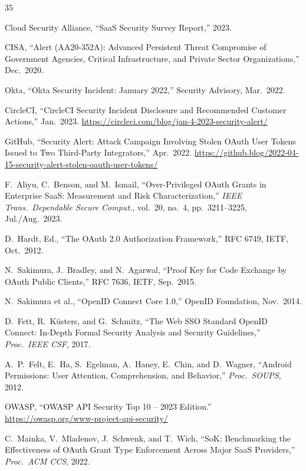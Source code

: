 \documentclass[12pt,a4paper]{report}
\begin{document}
\begin{thebibliography}{35}

Cloud Security Alliance, ``SaaS Security Survey Report,'' 2023.

CISA, ``Alert (AA20-352A): Advanced Persistent Threat Compromise of Government Agencies,
Critical Infrastructure, and Private Sector Organizations,'' Dec.\ 2020.

Okta, ``Okta Security Incident: January 2022,'' Security Advisory, Mar.\ 2022.

CircleCI, ``CircleCI Security Incident Disclosure and Recommended Customer Actions,'' Jan.\ 2023.
\url{https://circleci.com/blog/jan-4-2023-security-alert/}

GitHub, ``Security Alert: Attack Campaign Involving Stolen OAuth User Tokens Issued to Two
Third-Party Integrators,'' Apr.\ 2022.
\url{https://github.blog/2022-04-15-security-alert-stolen-oauth-user-tokens/}

F.\ Aliyu, C.\ Benson, and M.\ Ismail, ``Over-Privileged OAuth Grants in Enterprise SaaS:
Measurement and Risk Characterization,'' \textit{IEEE Trans.\ Dependable Secure Comput.},
vol.\ 20, no.\ 4, pp.\ 3211--3225, Jul./Aug.\ 2023.

D.\ Hardt, Ed., ``The OAuth 2.0 Authorization Framework,'' RFC 6749, IETF, Oct.\ 2012.

N.\ Sakimura, J.\ Bradley, and N.\ Agarwal, ``Proof Key for Code Exchange by OAuth Public
Clients,'' RFC 7636, IETF, Sep.\ 2015.

N.\ Sakimura et al., ``OpenID Connect Core 1.0,'' OpenID Foundation, Nov.\ 2014.

D.\ Fett, R.\ K\"{u}sters, and G.\ Schmitz, ``The Web SSO Standard OpenID Connect:
In-Depth Formal Security Analysis and Security Guidelines,'' \textit{Proc.\ IEEE CSF}, 2017.

A.\ P.\ Felt, E.\ Ha, S.\ Egelman, A.\ Haney, E.\ Chin, and D.\ Wagner, ``Android
Permissions: User Attention, Comprehension, and Behavior,'' \textit{Proc.\ SOUPS}, 2012.

OWASP, ``OWASP API Security Top 10 -- 2023 Edition.''
\url{https://owasp.org/www-project-api-security/}

C.\ Mainka, V.\ Mladenov, J.\ Schwenk, and T.\ Wich, ``SoK: Benchmarking the Effectiveness
of OAuth Grant Type Enforcement Across Major SaaS Providers,'' \textit{Proc.\ ACM CCS}, 2022.


\end{thebibliography}
\end{document}
